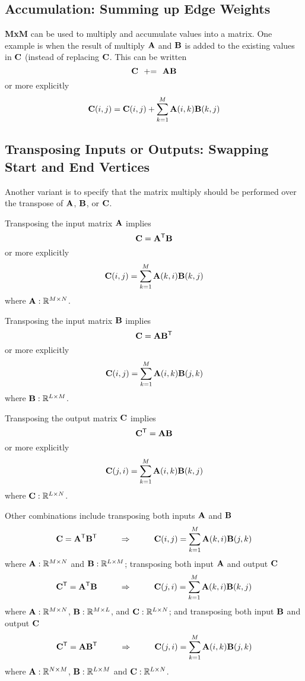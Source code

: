 \subsection{Accumulation: Summing up Edge Weights}

{\bf MxM} can be used to multiply and accumulate values into a matrix.  One example is when the result of multiply ${\bf A}$ and ${\bf B}$ is added to the existing values in ${\bf C}$ (instead of replacing ${\bf C}$.  This can be written
$$
   {\bf C} ~~ {+}{=} ~~ {\bf A} {\bf B}
$$
or more explicitly
$$
   {\bf C}(i,j) = {\bf C}(i,j) + \sum_{k=1}^M {\bf A}(i,k) {\bf B}(k,j)
$$

\subsection{Transposing Inputs or Outputs: Swapping Start and End Vertices}

Another variant is to specify that the matrix multiply should be performed over the transpose of  ${\bf A}$, ${\bf B}$, or ${\bf C}$.

Transposing the input matrix ${\bf A}$ implies
$$
   {\bf C} = {\bf A}^{\sf T} {\bf B}
$$
or more explicitly
$$
   {\bf C}(i,j) = \sum_{k=1}^M {\bf A}(k,i) {\bf B}(k,j)
$$
where ${\bf A}: \mathbb{R}^{M \times N}$.

Transposing the input matrix ${\bf B}$ implies
$$
   {\bf C} = {\bf A} {\bf B}^{\sf T}
$$
or more explicitly
$$
   {\bf C}(i,j) = \sum_{k=1}^M {\bf A}(i,k) {\bf B}(j,k)
$$
where ${\bf B}: \mathbb{R}^{L \times M}$.


Transposing the output matrix ${\bf C}$ implies
$$
   {\bf C}^{\sf T} = {\bf A} {\bf B}
$$
or more explicitly
$$
   {\bf C}(j,i) = \sum_{k=1}^M {\bf A}(i,k) {\bf B}(k,j)
$$
where ${\bf C}: \mathbb{R}^{L \times N}$.

Other combinations include transposing both inputs ${\bf A}$ and ${\bf B}$
$$
   {\bf C} = {\bf A}^{\sf T} {\bf B}^{\sf T} ~~~~~~~~ \Rightarrow ~~~~~~~~ {\bf C}(i,j) = \sum_{k=1}^M {\bf A}(k,i) {\bf B}(j,k)
$$
where ${\bf A}: \mathbb{R}^{M \times N}$ and ${\bf B}: \mathbb{R}^{L \times M}$; transposing both input ${\bf A}$ and output ${\bf C}$
$$
   {\bf C}^{\sf T} = {\bf A}^{\sf T} {\bf B} ~~~~~~~~ \Rightarrow ~~~~~~~~ {\bf C}(j,i) = \sum_{k=1}^M {\bf A}(k,i) {\bf B}(k,j)
$$
where ${\bf A}: \mathbb{R}^{M \times N}$, ${\bf B}: \mathbb{R}^{M \times L}$, and ${\bf C}: \mathbb{R}^{L \times N}$; and transposing both input ${\bf B}$ and output ${\bf C}$
$$
   {\bf C}^{\sf T} = {\bf A} {\bf B}^{\sf T} ~~~~~~~~ \Rightarrow ~~~~~~~~ {\bf C}(j,i) = \sum_{k=1}^M {\bf A}(i,k) {\bf B}(j,k)
$$
where ${\bf A}: \mathbb{R}^{N \times M}$, ${\bf B}: \mathbb{R}^{L \times M}$ and ${\bf C}: \mathbb{R}^{L \times N}$.

